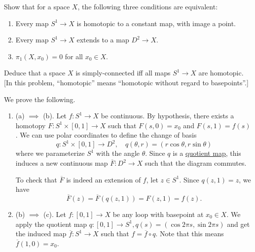	\begin{exercise}[Hatcher 1.1.5]
		Show that for a space $X$, the following three conditions are equivalent:
		\begin{enumerate}
			\item[(a)] Every map $S^1 \to X$ is homotopic to a constant map, with image a point.
			\item[(b)] Every map $S^1 \to X$ extends to a map $D^2 \to X$.
			\item[(c)] $\pi_1(X, x_0) = 0$ for all $x_0 \in X$.
		\end{enumerate}
		Deduce that a space $X$ is simply-connected iff all maps $S^1 \to X$ are homotopic.
		[In this problem, ``homotopic'' means ``homotopic without regard to basepoints''.]
	\end{exercise}
	\begin{solution}
		We prove the following. 
		\begin{enumerate}
			\item (a) $\implies$ (b). Let $f: S^1 \to X$ be continuous. By hypothesis, there exists a homotopy $F: S^1 \times [0, 1] \to X$ such that $F(s, 0) = x_0$ and $F(s, 1) = f(s)$. We can use polar coordinates to define the change of basis 
				\begin{equation}
					q: S^1 \times [0, 1] \to D^2, \quad q(\theta, r) = ( r\cos{\theta}, r\sin{\theta} )
				\end{equation}
				where we parameterize $S^1$ with the angle $\theta$. Since $q$ is a \hyperref[pst-def:quotient-map]{quotient map}, this induces a new continuous map $\overline{F}: D^2 \to X$ such that the diagram commutes. 

				\begin{center}
				\end{center}

				To check that $\overline{F}$ is indeed an extension of $f$, let $z\in S^1$. Since $q(z,1)=z$, we have
				\begin{equation}
					\overline{F}(z) = \overline{F}(q(z,1)) = F(z,1) = f(z).
				\end{equation}

			\item (b) $\implies$ (c). Let $f: [0, 1] \to X$ be any loop with basepoint at $x_0 \in X$. We apply the quotient map $q: [0, 1] \to S^1, q(s) = (\cos{2\pi s}, \sin{2 \pi s})$ and get the induced map $\overline{f}: S^1 \to X$ such that $f = \overline{f} \circ q$. Note that this means $\overline{f}(1, 0) = x_0$. 


\end{enumerate}
\end{solution}
